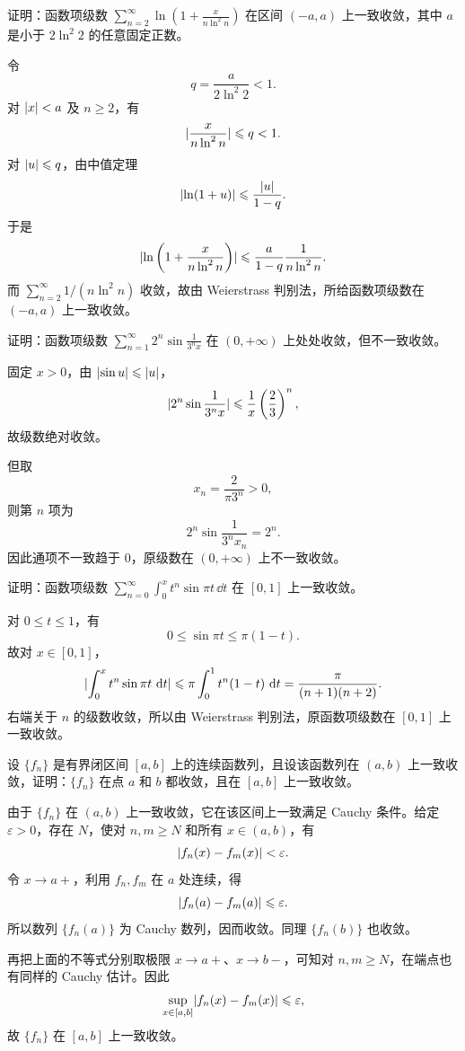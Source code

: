 \begin{xexercise}[4]
证明：函数项级数 $\displaystyle\sum_{n=2}^{\infty}\ln\left(1+\frac{x}{n\ln^2n}\right)$ 在区间 $(-a,a)$ 上一致收敛，其中 $a$ 是小于 $2\ln^2 2$ 的任意固定正数。
\end{xexercise}
\begin{xsolution}
令
\[
  q=\frac{a}{2\ln^2 2}<1.
\]
对 $\lvert x\rvert<a$ 及 $n\geqslant2$，有
\[
  \lvert\frac{x}{n\ln^2n}\rvert\leqslant q<1.
\]
对 $\lvert u\rvert\leqslant q$，由中值定理
\[
  \lvert\ln(1+u)\rvert\leqslant\frac{\lvert u\rvert}{1-q}.
\]
于是
\[
  \lvert\ln\left(1+\frac{x}{n\ln^2n}\right)\rvert
  \leqslant\frac{a}{1-q}\frac1{n\ln^2n}.
\]
而 $\sum_{n=2}^{\infty}1/(n\ln^2n)$ 收敛，故由 Weierstrass 判别法，所给函数项级数在 $(-a,a)$ 上一致收敛。
\end{xsolution}


\begin{xexercise}[5]
证明：函数项级数 $\displaystyle\sum_{n=1}^{\infty}2^n\sin\frac{1}{3^nx}$ 在 $(0,+\infty)$ 上处处收敛，但不一致收敛。
\end{xexercise}
\begin{xsolution}
固定 $x>0$，由 $\lvert\sin u\rvert\leqslant\lvert u\rvert$，
\[
  \lvert2^n\sin\frac1{3^nx}\rvert
  \leqslant\frac1x\left(\frac23\right)^n,
\]
故级数绝对收敛。

但取
\[
  x_n=\frac{2}{\pi3^n}>0,
\]
则第 $n$ 项为
\[
  2^n\sin\frac1{3^n x_n}=2^n.
\]
因此通项不一致趋于 $0$，原级数在 $(0,+\infty)$ 上不一致收敛。
\end{xsolution}


\begin{xexercise}[6]
证明：函数项级数 $\displaystyle\sum_{n=0}^{\infty}\int_0^x t^n\sin\pi t\,\dd t$ 在 $[0,1]$ 上一致收敛。
\end{xexercise}
\begin{xsolution}
对 $0\leqslant t\leqslant1$，有
\[
  0\leqslant\sin\pi t\leqslant\pi(1-t).
\]
故对 $x\in[0,1]$，
\[
  \lvert\int_0^x t^n\sin\pi t\,\mathop{}\!\mathrm{d} t\rvert
  \leqslant\pi\int_0^1 t^n(1-t)\,\mathop{}\!\mathrm{d} t
  =\frac{\pi}{(n+1)(n+2)}.
\]
右端关于 $n$ 的级数收敛，所以由 Weierstrass 判别法，原函数项级数在 $[0,1]$ 上一致收敛。
\end{xsolution}


\begin{xexercise}[7]
设 $\{f_n\}$ 是有界闭区间 $[a,b]$ 上的连续函数列，且设该函数列在 $(a,b)$ 上一致收敛，证明：$\{f_n\}$ 在点 $a$ 和 $b$ 都收敛，且在 $[a,b]$ 上一致收敛。
\end{xexercise}
\begin{xsolution}
由于 $\{f_n\}$ 在 $(a,b)$ 上一致收敛，它在该区间上一致满足 Cauchy 条件。给定 $\varepsilon>0$，存在 $N$，使对 $n,m\geqslant N$ 和所有 $x\in(a,b)$，有
\[
  \lvert f_n(x)-f_m(x)\rvert<\varepsilon.
\]
令 $x\to a+$，利用 $f_n,f_m$ 在 $a$ 处连续，得
\[
  \lvert f_n(a)-f_m(a)\rvert\leqslant\varepsilon.
\]
所以数列 $\{f_n(a)\}$ 为 Cauchy 数列，因而收敛。同理 $\{f_n(b)\}$ 也收敛。

再把上面的不等式分别取极限 $x\to a+$、$x\to b-$，可知对 $n,m\geqslant N$，在端点也有同样的 Cauchy 估计。因此
\[
  \sup_{x\in[a,b]}\lvert f_n(x)-f_m(x)\rvert\leqslant\varepsilon,
\]
故 $\{f_n\}$ 在 $[a,b]$ 上一致收敛。
\end{xsolution}



